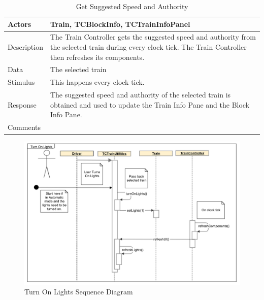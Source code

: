 \documentclass[]{article}
\begin{document}
\begin{table}[H]
	\centering
	\caption{Get Suggested Speed and Authority}
	\begin{tabular}{|l|l|}
		\hline
		Actors & \parbox[t]{10cm}{Train, TCBlockInfo, TCTrainInfoPanel} \\ \hline
		Description & \parbox[t]{10cm}{The Train Controller gets the suggested speed and authority from the selected train during every clock tick. The Train Controller then refreshes its components.} \\ \hline
		Data &  \parbox[t]{10cm}{The selected train} \\ \hline
		Stimulus &  \parbox[t]{10cm}{ This happens every clock tick. } \\ \hline
		Response & \parbox[t]{10cm}{The suggested speed and authority of the selected train is obtained and used to update the Train Info Pane and the Block Info Pane.  }\\ \hline
		Comments & \parbox[t]{10cm}{}  \\ \hline
	\end{tabular}
\end{table}

\begin{figure}[H]
	\centering
	\includegraphics[width=\textwidth]{tc_turnOnLights_usecase}
	\caption{Turn On Lights Sequence Diagram}
\end{figure}
\end{document}
